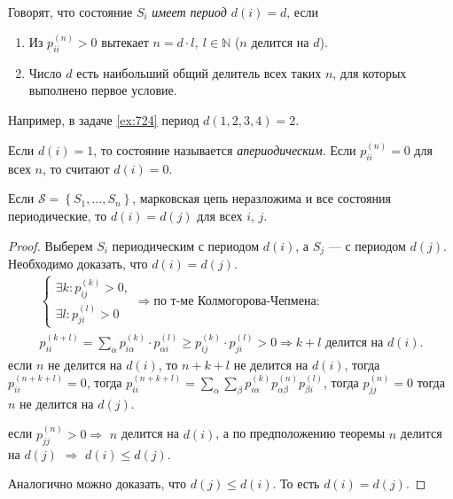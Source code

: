 \begin{definition}
  Говорят, что состояние $S_i$ \emph{имеет период $d(i) = d$}, если
  \begin{enumerate}
    \item Из $p_{ii}^{(n)} > 0$ вытекает $n = d \cdot l,\ l \in \mathbb{N}$ ($n$ делится на $d$).
    \item Число $d$ есть наибольший общий делитель всех таких $n$, для которых
      выполнено первое условие.
  \end{enumerate}
\end{definition}
Например, в задаче \ref{ex:724} период $d(1, 2, 3, 4) = 2$.

\begin{definition}
  Если $d(i) = 1$, то состояние называется \emph{апериодическим}.
  Если $p_{ii}^{(n)} = 0$ для всех $n$, то считают $d(i) = 0$.
\end{definition}

\begin{theorem}
  Если $\mathscr S = \left\{ S_1, \dots, S_n \right\} $, марковская цепь неразложима и все состояния
  периодические, то $d(i) = d(j)$ для всех $ i $, $ j $.
\end{theorem}
\begin{proof}
  Выберем $S_i$ периодическим с периодом $d(i)$, а $S_j$ --- с периодом $d(j)$.
  Необходимо доказать, что $d(i) = d(j)$.
  \begin{multline*}
    \begin{cases}
    \exists k : p_{ij}^{(k)} > 0, \\
      \exists l : p_{ji}^{(l)} > 0
    \end{cases}
    \Rightarrow \text{по т-ме Колмогорова-Чепмена: } \\
    p_{ii}^{(k+l)} = \sum_{\alpha} p_{i\alpha}^{(k)} \cdot p_{\alpha i}^{(l)} 
    \geqslant p_{ij}^{(k)} \cdot p_{ji}^{(l)} > 0
    \Rightarrow
    k+l \text{ делится на $d(i)$}.
  \end{multline*}
  если $n$ не делится на $d(i)$, то $n+k+l$ не делится на $d(i)$, тогда $p_{ii}^{(n+k+l)} = 0$, 
  тогда $p_{ii}^{(n+k+l)} = \sum_{\alpha} \sum_\beta p_{i\alpha}^{(k)} p_{\alpha \beta}^{(n)} 
  p_{\beta i}^{(l)}$, тогда $p_{jj}^{(n)} = 0$ тогда $n$ не делится на $d(j)$.

  если $p_{jj}^{(n)} > 0 \Rightarrow$ $n$ делится на $d(i)$, а по предположению теоремы $n$ делится 
  на $d(j)$ $\Rightarrow$ $d(i) \leqslant d(j)$.

  Аналогично можно доказать, что $d(j) \leqslant d(i)$. То есть $d(i) = d(j)$.
\end{proof}

